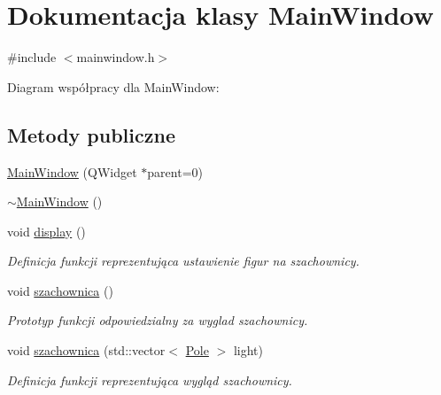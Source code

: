 \hypertarget{class_main_window}{\section{\-Dokumentacja klasy \-Main\-Window}
\label{class_main_window}
}


{\ttfamily \#include $<$mainwindow.\-h$>$}



\-Diagram współpracy dla \-Main\-Window\-:
\subsection*{\-Metody publiczne}
\begin{DoxyCompactItemize}
\item 
\hyperlink{class_main_window_a8b244be8b7b7db1b08de2a2acb9409db}{\-Main\-Window} (\-Q\-Widget $\ast$parent=0)
\item 
\hyperlink{class_main_window_ae98d00a93bc118200eeef9f9bba1dba7}{$\sim$\-Main\-Window} ()
\item 
void \hyperlink{class_main_window_a0083b949c18ccf71dcbe37f4258007c0}{display} ()
\begin{DoxyCompactList}\small\item\em \-Definicja funkcji reprezentująca ustawienie figur na szachownicy. \end{DoxyCompactList}\item 
void \hyperlink{class_main_window_a292626aba88863b28c3a44c6f8fff0c8}{szachownica} ()
\begin{DoxyCompactList}\small\item\em \-Prototyp funkcji odpowiedzialny za wyglad szachownicy. \end{DoxyCompactList}\item 
void \hyperlink{class_main_window_af63fa081a58f836dd71406b416e44036}{szachownica} (std\-::vector$<$ \hyperlink{class_pole}{\-Pole} $>$ light)
\begin{DoxyCompactList}\small\item\em \-Definicja funkcji reprezentująca wygląd szachownicy. \end{DoxyCompactList}\end{DoxyCompactItemize}

